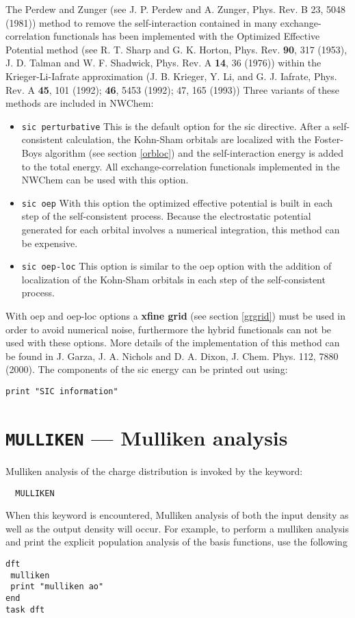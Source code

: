 The Perdew and Zunger (see J. P. Perdew and A. Zunger, Phys. Rev. B 23,
5048 (1981)) method to remove the self-interaction contained in many
exchange-correlation functionals has been implemented with the
Optimized Effective Potential method 
(see R. T. Sharp and G. K. Horton, Phys. Rev. {\bf 90}, 317 (1953),
J. D. Talman and W. F. Shadwick, Phys. Rev. A {\bf 14}, 36 (1976))
within the Krieger-Li-Iafrate approximation (J. B. Krieger, Y.  Li, 
and G. J. Iafrate, Phys. Rev. A {\bf 45}, 101 (1992); {\bf 46}, 5453 (1992); 
47, 165 (1993))
Three variants of these methods are included in NWChem:
\begin{itemize}
\item{\tt  sic perturbative} This is the default option for the sic
directive. After a self-consistent calculation, the Kohn-Sham
orbitals are localized with the Foster-Boys algorithm (see section
\ref{orbloc}) and the self-interaction energy is added to the total energy. 
All exchange-correlation functionals implemented in the NWChem can be
used with this option.
\item{\tt  sic oep} With this option the optimized effective potential is
built in each step of the self-consistent process. Because the electrostatic
potential generated for each orbital involves a numerical
integration, this method can be expensive.
\item{\tt  sic oep-loc} 
This option is similar to the oep option with the
addition of localization of the Kohn-Sham orbitals in each step of the 
self-consistent process.
\end{itemize}
With oep and oep-loc options a {\bf xfine grid} (see section \ref{grgrid})
must be used in order to avoid numerical noise, furthermore the hybrid 
functionals can not be used with these options.  More details of the
implementation of this method can be found in 
J. Garza, J. A. Nichols and D. A. Dixon, J. Chem. Phys. 112, 7880 (2000). 
The components of the sic energy can be printed out using:

\begin{verbatim}
print "SIC information"
\end{verbatim}


\section{{\tt MULLIKEN} --- Mulliken analysis}
Mulliken analysis of the charge distribution is invoked by the keyword:
\begin{verbatim}
  MULLIKEN
\end{verbatim}
When this keyword is encountered, Mulliken analysis of both the input 
density as well as the output density will occur.
For example, to perform a mulliken analysis and print the
explicit population analysis of the basis functions, use
the following
\begin{verbatim}
dft
 mulliken
 print "mulliken ao"
end
task dft
\end{verbatim}


